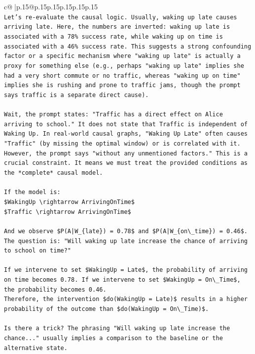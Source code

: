 \documentclass{article}
\begin{document}
{\begin{supertabular}{c@{$\;$}|p{.15\linewidth}@{}p{.15\linewidth}p{.15\linewidth}p{.15\linewidth}p{.15\linewidth}p{.15\linewidth}}
{{{\\ 
\texttt{Let's re{-}evaluate the causal logic. Usually, waking up late causes arriving late. Here, the numbers are inverted: waking up late is associated with a 78\% success rate, while waking up on time is associated with a 46\% success rate. This suggests a strong confounding factor or a specific mechanism where "waking up late" is actually a proxy for something else (e.g., perhaps "waking up late" implies she had a very short commute or no traffic, whereas "waking up on time" implies she is rushing and prone to traffic jams, though the prompt says traffic is a separate direct cause).} \\
\\ 
\texttt{Wait, the prompt states: "Traffic has a direct effect on Alice arriving to school." It does not state that Traffic is independent of Waking Up. In real{-}world causal graphs, "Waking Up Late" often causes "Traffic" (by missing the optimal window) or is correlated with it. However, the prompt says "without any unmentioned factors." This is a crucial constraint. It means we must treat the provided conditions as the *complete* causal model.} \\
\\ 
\texttt{If the model is:} \\
\texttt{\$WakingUp \textbackslash{}rightarrow ArrivingOnTime\$} \\
\texttt{\$Traffic \textbackslash{}rightarrow ArrivingOnTime\$} \\
\\ 
\texttt{And we observe \$P(A|W\_\{late\}) = 0.78\$ and \$P(A|W\_\{on\textbackslash{}\_time\}) = 0.46\$.} \\
\texttt{The question is: "Will waking up late increase the chance of arriving to school on time?"} \\
\\ 
\texttt{If we intervene to set \$WakingUp = Late\$, the probability of arriving on time becomes 0.78. If we intervene to set \$WakingUp = On\textbackslash{}\_Time\$, the probability becomes 0.46.} \\
\texttt{Therefore, the intervention \$do(WakingUp = Late)\$ results in a higher probability of the outcome than \$do(WakingUp = On\textbackslash{}\_Time)\$.} \\
\\ 
\texttt{Is there a trick? The phrasing "Will waking up late increase the chance..." usually implies a comparison to the baseline or the alternative state.} \\
}}}
\end{supertabular}}
\end{document}
